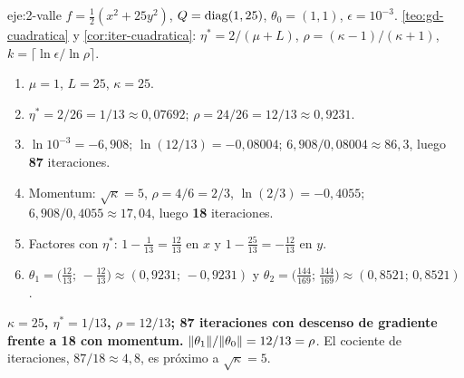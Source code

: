 \begin{solucion}{eje:2-valle}
\datos $f=\frac12(x^{2}+25y^{2})$, $Q=\operatorname{diag}(1,25)$, $\theta_0=(1,1)$, $\epsilon=10^{-3}$.
\planteamiento \cref{teo:gd-cuadratica} y \cref{cor:iter-cuadratica}: $\eta^{\ast}=2/(\mu+L)$, $\rho=(\kappa-1)/(\kappa+1)$, $k=\lceil\ln\epsilon/\ln\rho\rceil$.
\pasos
\begin{enumerate}[label=\arabic*.]
  \item $\mu=1$, $L=25$, $\kappa=25$.
  \item $\eta^{\ast}=2/26=1/13\approx 0{,}07692$; $\rho=24/26=12/13\approx 0{,}9231$.
  \item $\ln 10^{-3}=-6{,}908$; $\ln(12/13)=-0{,}08004$; $6{,}908/0{,}08004\approx 86{,}3$, luego \textbf{87} iteraciones.
  \item Momentum: $\sqrt\kappa=5$, $\rho=4/6=2/3$, $\ln(2/3)=-0{,}4055$; $6{,}908/0{,}4055\approx 17{,}04$, luego \textbf{18} iteraciones.
  \item Factores con $\eta^{\ast}$: $1-\frac{1}{13}=\frac{12}{13}$ en $x$ y $1-\frac{25}{13}=-\frac{12}{13}$ en $y$.
  \item $\theta_1=\bigl(\frac{12}{13};\,-\frac{12}{13}\bigr)\approx(0{,}9231;\,-0{,}9231)$ y $\theta_2=\bigl(\frac{144}{169};\,\frac{144}{169}\bigr)\approx(0{,}8521;\,0{,}8521)$.
\end{enumerate}
\resultado \textbf{$\kappa=25$, $\eta^{\ast}=1/13$, $\rho=12/13$; 87 iteraciones con descenso de gradiente frente a 18 con momentum.}
\comprobacion $\lVert\theta_1\rVert/\lVert\theta_0\rVert=12/13=\rho$. El cociente de iteraciones, $87/18\approx 4{,}8$, es próximo a $\sqrt\kappa=5$.
\end{solucion}


